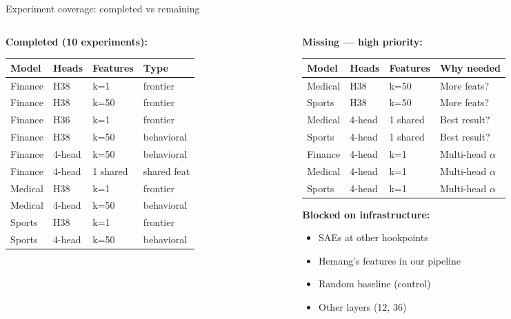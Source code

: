 \documentclass[aspectratio=169]{beamer}
\begin{document}
\begin{frame}{Experiment coverage: completed vs remaining}
\begin{columns}
\begin{column}{0.48\textwidth}
\textbf{\textcolor{green!60!black}{Completed (10 experiments):}}

\footnotesize
\begin{tabular}{llll}
\toprule
Model & Heads & Features & Type \\
\midrule
Finance & H38 & k=1 & frontier \\
Finance & H38 & k=50 & frontier \\
Finance & H36 & k=1 & frontier \\
Finance & H38 & k=50 & behavioral \\
Finance & 4-head & k=50 & behavioral \\
Finance & 4-head & 1 shared & shared feat \\
Medical & H38 & k=1 & frontier \\
Medical & 4-head & k=50 & behavioral \\
Sports  & H38 & k=1 & frontier \\
Sports  & 4-head & k=50 & behavioral \\
\bottomrule
\end{tabular}
\end{column}
\begin{column}{0.48\textwidth}
\textbf{\textcolor{red!70!black}{Missing --- high priority:}}

\footnotesize
\begin{tabular}{llll}
\toprule
Model & Heads & Features & Why needed \\
\midrule
Medical & H38 & k=50 & More feats? \\
Sports  & H38 & k=50 & More feats? \\
Medical & 4-head & 1 shared & Best result? \\
Sports  & 4-head & 1 shared & Best result? \\
Finance & 4-head & k=1 & Multi-head $\alpha$ \\
Medical & 4-head & k=1 & Multi-head $\alpha$ \\
Sports  & 4-head & k=1 & Multi-head $\alpha$ \\
\bottomrule
\end{tabular}

\vspace{0.5em}
\normalsize
\textbf{Blocked on infrastructure:}
\footnotesize
\begin{itemize}
    \item SAEs at other hookpoints
    \item Hemang's features in our pipeline
    \item Random baseline (control)
    \item Other layers (12, 36)
\end{itemize}
\end{column}
\end{columns}
\end{frame}
\end{document}
